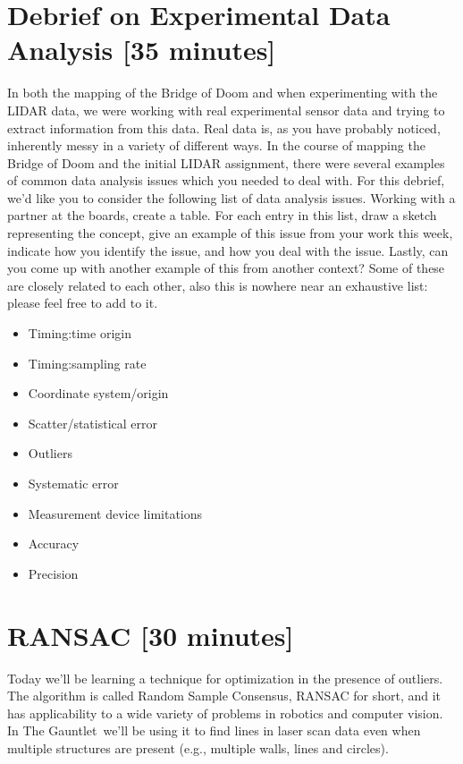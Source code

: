 \documentclass{tufte-handout}
\begin{document}
\ee


\section{Debrief on Experimental Data Analysis [35 minutes]}

In both the mapping of the Bridge of Doom and when experimenting with the LIDAR data, we were working with real experimental sensor data and trying to extract information from this data.  Real data is, as you have probably noticed, inherently messy in a variety of different ways.  In the course of mapping the Bridge of Doom and the initial LIDAR assignment, there were several examples of common data analysis issues which you needed to deal with.  For this debrief, we'd like you to consider the following list of data analysis issues.  Working with a partner at the boards, create a table.  For each entry in this list, draw a sketch representing the concept, give an example of this issue from your work this week, indicate how you identify the issue, and how you deal with the issue. Lastly, can you come up with another example of this from another context?  Some of these are closely related to each other, also this is nowhere near an exhaustive list:  please feel free to add to it.

\begin{itemize}
\item Timing:time origin
\item Timing:sampling rate
\item Coordinate system/origin
\item Scatter/statistical error
\item Outliers
\item Systematic error
\item Measurement device limitations
\item Accuracy
\item Precision
\end{itemize}

\section{RANSAC [30 minutes]}
Today we'll be learning a technique for optimization in the presence of outliers. The algorithm is called Random Sample Consensus, RANSAC for short, and it has applicability to a wide variety of problems in robotics and computer vision.  In The Gauntlet\texttrademark~we'll be using it to find lines in laser scan data even when multiple structures are present (e.g., multiple walls, lines and circles).
\end{document}
